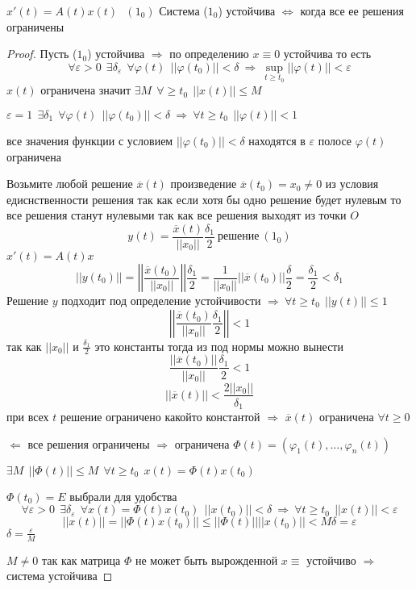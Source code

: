 \begin{block}[Утверждение 1]
  $x'(t) = A(t)x(t) ~~~ (1_0)$
  Система ($1_0$) устойчива $\Leftrightarrow$ когда все ее решения ограничены
\end{block}

\begin{proof}
  Пусть ($1_0$) устойчива $\Rightarrow$ по определению $x \equiv 0$ устойчива
  то есть
  $$
  \forall \varepsilon > 0 ~~ \exists \delta_{\varepsilon} ~~ \forall \varphi(t)
  ~~ ||\varphi(t_0)|| < \delta ~ \Rightarrow ~ \sup_{t \ge t_0} ||\varphi(t)||
  < \varepsilon
  $$
  $x(t)$ ограничена значит $\exists M ~~ \forall \ge t_0 ~~ ||x(t)|| \le M$

  $\varepsilon = 1 ~~ \exists \delta_1 ~~ \forall \varphi(t) ~~ ||\varphi(t_0)||
  < \delta ~ \Rightarrow ~ \forall t \ge t_0 ~~ ||\varphi(t)|| < 1$

  все значения функции с условием $||\varphi(t_0)|| < \delta$ находятся в
  $\varepsilon$ полосе $\varphi(t)$ ограничена

  Возьмите любой решение $\overline{x}(t)$ произведение $\overline{x}(t_0) =
  x_0 \not = 0$ из условия едиснственности решения так как если хотя бы одно
  решение будет нулевым то все решения станут нулевыми так как все решения
  выходят из точки $O$
  $$
  y(t) = \frac{\overline{x}(t)}{||x_0||} \frac{\delta_1}{2} ~ \text{решение} ~
  (1_0)
  $$
  $x'(t) = A(t) x$
  $$
  ||y(t_0)|| = \left|\left| \frac{\overline{x}(t_0)}{||x_0||} \right|\right|
  \frac{\delta_1}{2} = \frac{1}{||x_0||} ||\overline{x}(t_0)||
  \frac{\delta}{2} = \frac{\delta_1}{2} < \delta_1
  $$
  Решение $y$ подходит под определение устойчивости $\Rightarrow ~ \forall
  t \ge t_0 ~~ ||y(t)|| \le 1$
  $$
  \left|\left| \frac{\overline{x}(t_0)}{||x_0||} \frac{\delta_1}{2}
  \right|\right| < 1
  $$
  так как $||x_0||$ и $\frac{\delta_1}{2}$ это константы тогда из под нормы
  можно вынести
  $$
  \frac{||\overline{x}(t_0)||}{||x_0||} \frac{\delta_1}{2} < 1
  $$
  $$
  ||\overline{x}(t)|| < \frac{2||x_0||}{\delta_1}
  $$
  при всех $t$ решение ограничено какойто константой $\Rightarrow$
  $\overline{x}(t)$ ограничена $\forall t \ge 0$

  $\Leftarrow$ все решения ограничены $\Rightarrow$ ограничена $\Phi(t) =
  (\varphi_1(t), \ldots, \varphi_n(t))$

  $\exists M ~~ ||\Phi(t)|| \le M ~~ \forall t \ge t_0 ~~ x(t) = \Phi(t)x(t_0)$

  $\Phi(t_0) = E$ выбрали для удобства
  $$
  \forall \varepsilon > 0 ~~ \exists \delta_{\varepsilon} ~~ \forall x(t) =
  \Phi(t)x(t_0) ~~ ||x(t_0)|| < \delta ~ \Rightarrow ~ \forall t \ge t_0 ~~
  ||x(t)|| < \varepsilon
  $$
  $$
  ||x(t)|| = ||\Phi(t) x(t_0)|| \le ||\Phi(t)|| ||x(t_0)|| < M \delta =
  \varepsilon
  $$
  $\delta = \frac{\varepsilon}{M}$

  $M \not= 0$ так как матрица $\Phi$ не может быть вырожденной $x \equiv$
  устойчиво $\Rightarrow$ система устойчива
\end{proof}

